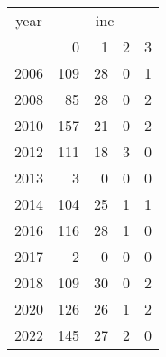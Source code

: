 \footnotesize\begin{tabular}[t]{lrrrr}
\toprule
\multicolumn{1}{c}{year} & \multicolumn{4}{c}{inc} \\
\cmidrule(l{3pt}r{3pt}){1-1} \cmidrule(l{3pt}r{3pt}){2-5}
  & 0 & 1 & 2 & 3\\
\midrule
2006 & 109 & 28 & 0 & 1\\
2008 & 85 & 28 & 0 & 2\\
2010 & 157 & 21 & 0 & 2\\
2012 & 111 & 18 & 3 & 0\\
2013 & 3 & 0 & 0 & 0\\
2014 & 104 & 25 & 1 & 1\\
2016 & 116 & 28 & 1 & 0\\
2017 & 2 & 0 & 0 & 0\\
2018 & 109 & 30 & 0 & 2\\
2020 & 126 & 26 & 1 & 2\\
2022 & 145 & 27 & 2 & 0\\
\bottomrule
\end{tabular}
